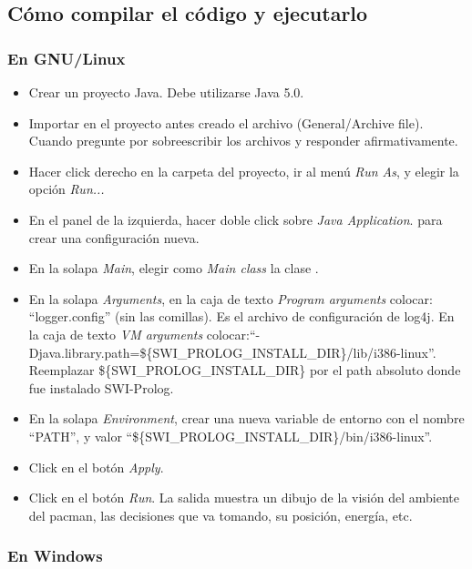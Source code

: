 \subsection{Cómo compilar el código y ejecutarlo}

\subsubsection{En GNU/Linux}
\begin{itemize}

\item Crear un proyecto Java. Debe utilizarse Java 5.0.

\item Importar en el proyecto antes creado el archivo 
(General/Archive file).  Cuando pregunte por sobreescribir los archivos
 y  responder afirmativamente.

\item Hacer click derecho en la carpeta del proyecto, ir al menú \emph{Run As},
y elegir la opción \emph{Run...}

\item En el panel de la izquierda, hacer doble click sobre \emph{Java Application}.
para crear una configuración nueva.

\item En la solapa \emph{Main}, elegir como \emph{Main class} la clase .

\item En la solapa \emph{Arguments}, en la caja de texto \emph{Program arguments} colocar:
``logger.config'' (sin las comillas). Es el archivo de configuración de log4j. En la caja de texto \emph{VM arguments}
colocar:\newline``-Djava.library.path=\$\{SWI\_PROLOG\_INSTALL\_DIR\}/lib/i386-linux''.\newline
Reemplazar \$\{SWI\_PROLOG\_INSTALL\_DIR\} por el path absoluto donde fue instalado SWI-Prolog.

\item En la solapa \emph{Environment}, crear una nueva variable de entorno con el nombre ``PATH'',
y valor ``\$\{SWI\_PROLOG\_INSTALL\_DIR\}/bin/i386-linux''.

\item Click en el botón \emph{Apply}.

\item Click en el botón \emph{Run}. La salida muestra un dibujo de la visión del ambiente del pacman,
las decisiones que va tomando, su posición, energía, etc.

\end{itemize}

\subsubsection{En Windows}

